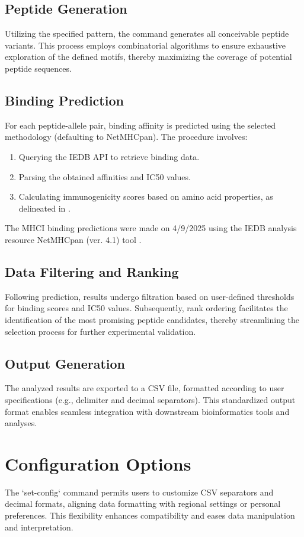 \documentclass{article}
\begin{document}
\subsection{Peptide Generation}
Utilizing the specified pattern, the command generates all conceivable peptide variants. This process employs combinatorial algorithms to ensure exhaustive exploration of the defined motifs, thereby maximizing the coverage of potential peptide sequences.

\subsection{Binding Prediction}
For each peptide-allele pair, binding affinity is predicted using the selected methodology (defaulting to NetMHCpan). The procedure involves:
\begin{enumerate}
    \item Querying the IEDB API to retrieve binding data.
    \item Parsing the obtained affinities and IC50 values.
    \item Calculating immunogenicity scores based on amino acid properties, as delineated in \cite{smith2020immunogenicity}.
\end{enumerate}

The MHCI binding predictions were made on 4/9/2025 using the IEDB analysis resource NetMHCpan (ver. 4.1) tool \cite{reynisson2020netmhcpan}.

\subsection{Data Filtering and Ranking}
Following prediction, results undergo filtration based on user-defined thresholds for binding scores and IC50 values. Subsequently, rank ordering facilitates the identification of the most promising peptide candidates, thereby streamlining the selection process for further experimental validation.

\subsection{Output Generation}
The analyzed results are exported to a CSV file, formatted according to user specifications (e.g., delimiter and decimal separators). This standardized output format enables seamless integration with downstream bioinformatics tools and analyses.

\section{Configuration Options}
The `set-config` command permits users to customize CSV separators and decimal formats, aligning data formatting with regional settings or personal preferences. This flexibility enhances compatibility and eases data manipulation and interpretation.
\end{document}
